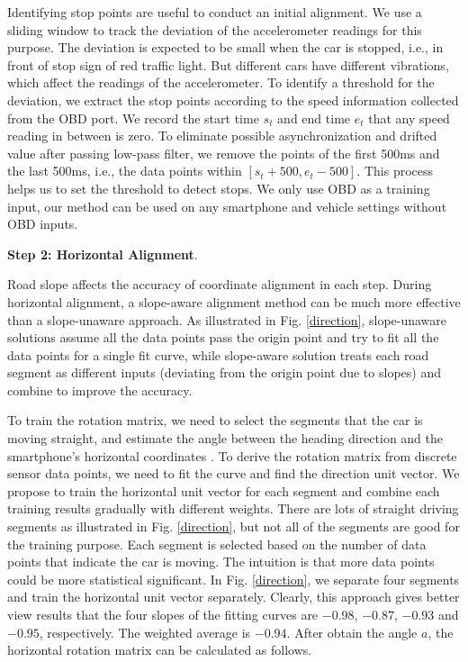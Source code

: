 Identifying stop points are useful to conduct an initial alignment. 
We use a sliding window to track the deviation of the
accelerometer readings for this purpose.
The deviation is expected to be small when the car is stopped, 
i.e., in front of stop sign of red traffic light. 
But different cars have different vibrations, 
which affect the readings of the accelerometer. 
To identify a threshold for the deviation, 
we extract the stop points according to the speed information
collected from the OBD port.
We record the start time $s_t$ and end time $e_t$ that 
any speed reading in between is zero. 
To eliminate possible asynchronization and drifted value
after passing low-pass filter, 
we remove the points of the first 500ms and the last 500ms,
i.e., the data points within $[s_t + 500, e_t - 500]$. 
This process helps us to set the threshold to detect
stops. 
We only use OBD as a training input, 
our method can be used on any smartphone and vehicle settings
without OBD inputs. 
 

\textbf{Step 2: Horizontal Alignment}. 


Road slope affects the accuracy of coordinate alignment
in each step. 
During horizontal alignment, a slope-aware alignment method can
be much more effective than a slope-unaware approach. 
As illustrated in Fig. \ref{direction}, 
slope-unaware solutions assume all the data points 
pass the origin point and try to fit all the data
points for a single fit curve, 
while slope-aware solution treats each road segment
as different inputs (deviating from the origin point
due to slopes) and combine to improve the accuracy. 

To train the rotation matrix, we need to select the segments that the car is moving 
straight, and estimate the angle between the 
heading direction and the smartphone's horizontal coordinates \cite{wang2013sensing}.
To derive the rotation matrix from discrete sensor data points, 
we need to fit the curve and find the direction unit vector. 
We propose to train the horizontal
unit vector for each segment and combine each training results gradually with different weights.
There are lots of straight driving segments as illustrated in Fig. \ref{direction}, 
but not all of the segments are good for the training purpose. 
Each segment is selected based on the number of data points that
indicate the car is moving.
The intuition is that more data points could be more statistical significant. 
In Fig. \ref{direction}, we separate four segments and train the 
horizontal unit vector separately.
Clearly, this approach gives better view results that the four slopes of the 
fitting curves are $-0.98$, $-0.87$, $-0.93$ and $-0.95$, respectively. 
The weighted average is $-0.94$. 
After obtain the angle $a$, the horizontal 
rotation matrix can be calculated as follows. 

